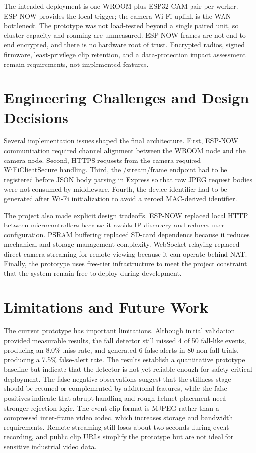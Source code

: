 \documentclass[conference]{IEEEtran}
\begin{document}
The intended deployment is one WROOM plus ESP32-CAM pair per worker. ESP-NOW provides the local trigger; the camera Wi-Fi uplink is the WAN bottleneck. The prototype was not load-tested beyond a single paired unit, so cluster capacity and roaming are unmeasured. ESP-NOW frames are not end-to-end encrypted, and there is no hardware root of trust. Encrypted radios, signed firmware, least-privilege clip retention, and a data-protection impact assessment remain requirements, not implemented features.

\section{Engineering Challenges and Design Decisions}
Several implementation issues shaped the final architecture. First, ESP-NOW communication required channel alignment between the WROOM node and the camera node. Second, HTTPS requests from the camera required WiFiClientSecure handling. Third, the /stream/frame endpoint had to be registered before JSON body parsing in Express so that raw JPEG request bodies were not consumed by middleware. Fourth, the device identifier had to be generated after Wi-Fi initialization to avoid a zeroed MAC-derived identifier.

The project also made explicit design tradeoffs. ESP-NOW replaced local HTTP between microcontrollers because it avoids IP discovery and reduces user configuration. PSRAM buffering replaced SD-card dependence because it reduces mechanical and storage-management complexity. WebSocket relaying replaced direct camera streaming for remote viewing because it can operate behind NAT. Finally, the prototype uses free-tier infrastructure to meet the project constraint that the system remain free to deploy during development.

\section{Limitations and Future Work}
The current prototype has important limitations. Although initial validation provided measurable results, the fall detector still missed 4 of 50 fall-like events, producing an 8.0\% miss rate, and generated 6 false alerts in 80 non-fall trials, producing a 7.5\% false-alert rate. The results establish a quantitative prototype baseline but indicate that the detector is not yet reliable enough for safety-critical deployment. The false-negative observations suggest that the stillness stage should be retuned or complemented by additional features, while the false positives indicate that abrupt handling and rough helmet placement need stronger rejection logic. The event clip format is MJPEG rather than a compressed inter-frame video codec, which increases storage and bandwidth requirements. Remote streaming still loses about two seconds during event recording, and public clip URLs simplify the prototype but are not ideal for sensitive industrial video data.
\end{document}
